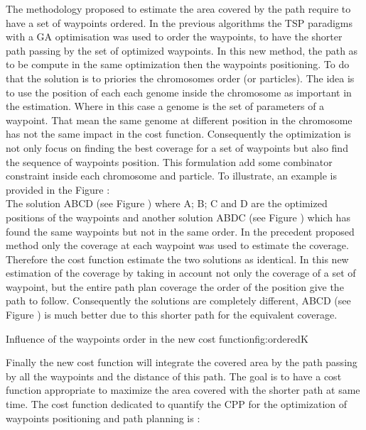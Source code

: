 The methodology proposed to estimate the area covered by the path require to have a set of waypoints ordered.  In the previous algorithms the TSP paradigms with a GA optimisation was used to order the waypoints, to have the shorter path passing by the set of optimized waypoints. In this new method, the path as to be compute in the same optimization then the waypoints positioning. 
To do that the solution is to priories the chromosomes order (or particles). The idea is to use the position of each each genome inside the chromosome as important in the estimation. Where in this case a genome is the set of parameters of a waypoint. That mean the same genome at different position in the chromosome has not the same impact in the cost function. Consequently the optimization is not only focus on finding the best coverage for a set of waypoints but also find the sequence of waypoints position. This formulation add some combinator constraint inside each chromosome and particle.
To illustrate, an example is provided in the Figure  : \\
The solution ABCD (see Figure ) where A; B; C and D are the optimized positions of the waypoints and another solution  ABDC (see Figure ) which has found the same waypoints but not in the same order. In the precedent proposed method only the coverage at each waypoint was used to estimate the coverage. Therefore the cost function estimate the two solutions as identical. 
In this new estimation of the coverage by taking in account not only the coverage of a set of waypoint, but the entire path plan coverage the order of the position give the path to follow. Consequently the solutions are completely different, ABCD (see Figure ) is much better due to this shorter path for the equivalent coverage.
  \begin{mfigures}[!]{Influence of the waypoints order in the new cost function}{fig:orderedK} \centering
\end{mfigures}   

 Finally the new cost function will integrate the covered area by the path passing  by all the waypoints and the distance of this path. The goal is to have a cost function appropriate to maximize the area covered with the shorter path at same time.
 The cost function dedicated to quantify the CPP for the optimization of waypoints positioning and path planning is :
 

